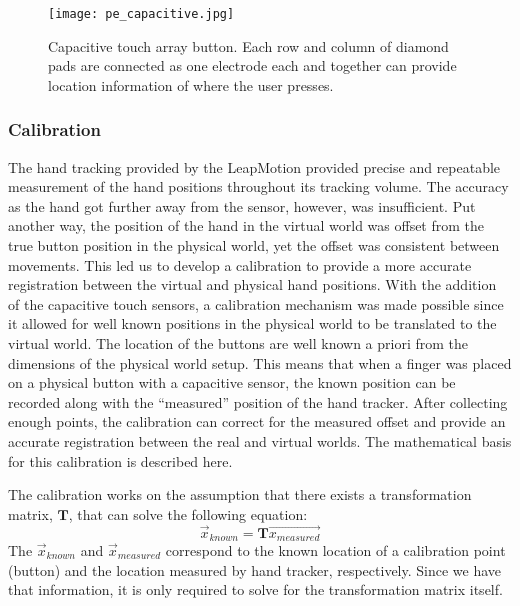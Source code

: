 \begin{figure}
    \centering
    \texttt{[image: pe\_capacitive.jpg]}
    \caption{Capacitive touch array button. Each row and column of diamond pads are connected as one electrode each and together can provide location information of where the user presses.}
    \label{fig:pe_capacitive}
\end{figure}

\subsubsection{Calibration}

The hand tracking provided by the LeapMotion provided precise and repeatable measurement of the hand positions throughout its tracking volume.
The accuracy as the hand got further away from the sensor, however, was insufficient.
Put another way, the position of the hand in the virtual world was offset from the true button position in the physical world, yet the offset was consistent between movements.
This led us to develop a calibration to provide a more accurate registration between the virtual and physical hand positions.
With the addition of the capacitive touch sensors, a calibration mechanism was made possible since it allowed for well known positions in the physical world to be translated to the virtual world.
The location of the buttons are well known a priori from the dimensions of the physical world setup.
This means that when a finger was placed on a physical button with a capacitive sensor, the known position can be recorded along with the ``measured'' position of the hand tracker.
After collecting enough points, the calibration can correct for the measured offset and provide an accurate registration between the real and virtual worlds.
The mathematical basis for this calibration is described here.

The calibration works on the assumption that there exists a transformation matrix, $\mathbf{T}$, that can solve the following equation:
\begin{equation}
    \vec{x}_{known} = \mathbf{T}\vec{x_{measured}}
    \label{eq:proto_Tvec}
\end{equation}
The $\vec{x}_{known}$ and $\vec{x}_{measured}$ correspond to the known location of a calibration point (button) and the location measured by hand tracker, respectively.
Since we have that information, it is only required to solve for the transformation matrix itself.

